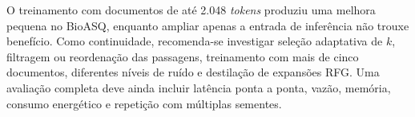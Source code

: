 O treinamento com documentos de até 2.048 \textit{tokens} produziu uma melhora pequena no BioASQ, enquanto ampliar apenas a entrada de inferência não trouxe benefício. Como continuidade, recomenda-se investigar seleção adaptativa de $k$, filtragem ou reordenação das passagens, treinamento com mais de cinco documentos, diferentes níveis de ruído e destilação de expansões RFG. Uma avaliação completa deve ainda incluir latência ponta a ponta, vazão, memória, consumo energético e repetição com múltiplas sementes.
